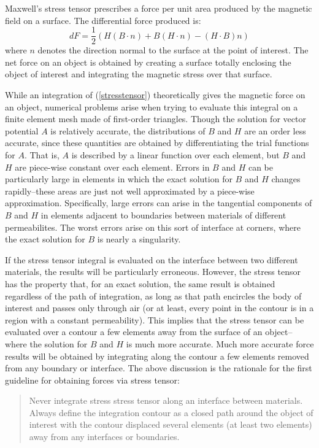 \documentclass[12pt]{report}
\newcommand{\be}{\begin{equation}}
\newcommand{\ee}{\end{equation}}
\begin{document}
Maxwell's stress tensor prescribes a force per unit area produced
by the magnetic field on a surface.  The differential force
produced is:
\be \label{stresstensor} dF= \mbox{$\frac{1}{2}$} \left(
H(B \cdot n) + B(H \cdot n) - (H \cdot B) n \right) \ee where $n$
denotes the direction normal to the surface at the point of
interest.  The net force on an object is obtained by creating a
surface totally enclosing the object of interest and integrating
the magnetic stress over that surface.

While an integration of (\ref{stresstensor}) theoretically gives
the magnetic force on an object, numerical problems arise when
trying to evaluate this integral on a finite element mesh made of
first-order triangles.  Though the solution for vector potential
$A$ is relatively accurate, the distributions of $B$ and $H$ are an
order less accurate, since these quantities are obtained by
differentiating the trial functions for $A$.  That is, $A$ is
described by a linear function over each element, but $B$ and $H$
are piece-wise constant over each element.  Errors in $B$ and $H$
can be particularly large in elements in which the exact solution
for $B$ and $H$ changes rapidly--these areas are just not well
approximated by a piece-wise approximation.  Specifically, large
errors can arise in the tangential components of $B$ and $H$ in
elements adjacent to boundaries between materials of different
permeabilites.  The worst errors arise on this sort of interface at
corners, where the exact solution for $B$ is nearly a singularity.

If the stress tensor integral is evaluated on the interface between
two different materials, the results will be particularly
erroneous. However, the stress tensor has the property that, for an
exact solution, the same result is obtained regardless of the path
of integration, as long as that path encircles the body of interest
and passes only through air (or at least, every point in the
contour is in a region with a constant permeability). This implies
that the stress tensor can be evaluated over a contour a few
elements away from the surface of an object--where the solution for
$B$ and $H$ is much more accurate. Much more accurate force results
will be obtained by integrating along the contour a few elements
removed from any boundary or interface. The above discussion is the
rationale for the first guideline for obtaining forces via stress
tensor:

\begin{quote}
Never integrate stress stress tensor along an interface between
materials.  Always define the integration contour as a closed path
around the object of interest with the contour displaced several
elements (at least two elements) away from any interfaces or
boundaries.
\end{quote}
\end{document}
